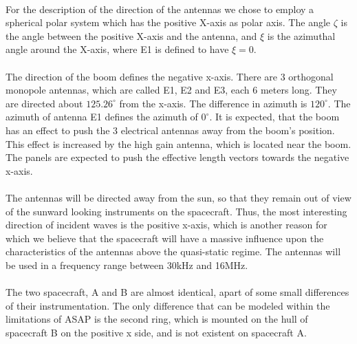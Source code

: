 \documentclass[a4paper,10pt]{thesis}
\begin{document}
\paragraph*{}
For the description of the direction of the antennas we chose to employ a spherical polar system which has the positive X-axis as polar axis. The angle $\zeta$ is the angle between the positive X-axis and the antenna, and $\xi$ is the azimuthal angle around the X-axis, where E1 is defined to have $\xi=0$.

\paragraph*{}
The direction of the
boom defines the negative x-axis. There are 3 orthogonal monopole antennas,
which are called E1, E2 and E3, each 6 meters
long. They are directed about $125.26^\circ$ from the x-axis. The
difference in azimuth is $120^\circ$. The azimuth of antenna
E1 defines the azimuth of $0^\circ$. It is expected, that the boom has an
effect to push the 3 electrical antennas away from the boom's position. This effect is
increased by the high gain antenna, which is located near the
boom. The panels are expected to push the effective length vectors
towards the negative x-axis.

\paragraph*{}
The antennas will be directed away from the sun, so that they
remain out of view of the sunward looking instruments on the
spacecraft. Thus, the most interesting direction of incident waves
is the positive x-axis, which is another reason for which we
believe that the spacecraft will have a massive influence upon the
characteristics of the antennas above the quasi-static regime. The
antennas will be used in a frequency range between 30kHz and
16MHz.

\paragraph*{}
The two spacecraft, A and B are almost identical, apart of some small differences of their instrumentation. The only difference that can be modeled within the limitations of ASAP is the second ring, which is mounted on the hull of spacecraft B on the positive x side, and is not existent on spacecraft A.
\end{document}
